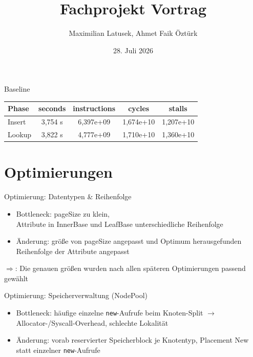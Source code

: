 \documentclass[aspectratio=169,13pt]{beamer}
\title{Fachprojekt Vortrag}
\author{Maximilian Latusek, Ahmet Faik Öztürk}
\date{28. Juli 2026}
\begin{document}
	
	\maketitle
	
	\begin{frame}{Baseline}
		\centering
		\begin{table}
			\begin{tabular}{lcccc}
				\toprule
				Phase & seconds & instructions & cycles & stalls \\
				\midrule
				Insert & 3,754 s & 6,397e+09 & 1,674e+10 & 1,207e+10 \\
				Lookup & 3,822 s & 4,777e+09 & 1,710e+10 & 1,360e+10 \\
				\bottomrule
			\end{tabular}
		\end{table}
	\end{frame}
	
	
	\section{Optimierungen}
	
	\begin{frame}{Optimierung: Datentypen \& Reihenfolge}
		\begin{itemize}
			\item Bottleneck: pageSize zu klein, \\
			Attribute in InnerBase und LeafBase unterschiedliche Reihenfolge\\
			\vspace{0,3cm}
			\item Änderung: größe von pageSize angepasst und Optimum herausgefunden\\
			Reihenfolge der Attribute angepasst
		\end{itemize}
		$\Rightarrow$: Die genauen größen wurden nach allen späteren Optimierungen passend gewählt
	\end{frame}
	
	
	\begin{frame}{Optimierung: Speicherverwaltung (NodePool)}
		\begin{itemize}
			\item Bottleneck: häufige einzelne \texttt{new}-Aufrufe beim Knoten-Split
			$\rightarrow$ Allocator-/Syscall-Overhead, schlechte Lokalität
			\item Änderung: vorab reservierter Speicherblock je Knotentyp,
			Placement New statt einzelner \texttt{new}-Aufrufe
		\end{itemize}
	\end{frame}
	
\end{document}
